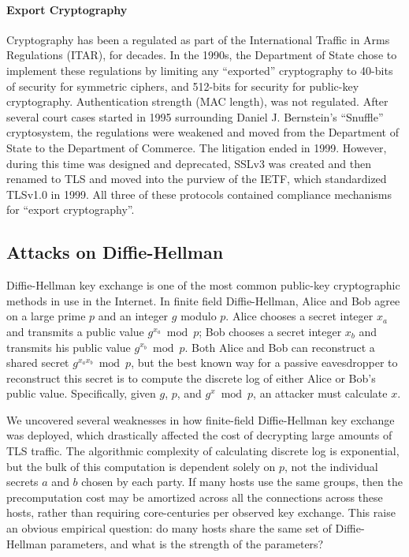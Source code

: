 \paragraph{Export Cryptography}
Cryptography has been a regulated as part of the International Traffic in Arms
Regulations (ITAR), for decades. In the 1990s, the Department of State chose to
implement these regulations by limiting any ``exported'' cryptography to
40-bits of security for symmetric ciphers, and 512-bits for security for
public-key cryptography. Authentication strength (\eg MAC length), was not
regulated. After several court cases started in 1995 surrounding Daniel J.
Bernstein's ``Snuffle'' cryptosystem, the regulations were weakened and moved
from the Department of State to the Department of Commerce. The litigation
ended in 1999. However, during this time \ssltwo was designed and deprecated,
SSLv3 was created and then renamed to TLS and moved into the purview of the
IETF, which standardized TLSv1.0 in 1999. All three of these protocols
contained compliance mechanisms for ``export cryptography''.

\subsection{Attacks on Diffie-Hellman}

Diffie-Hellman key exchange is one of the most common public-key
cryptographic methods in use in the Internet. In finite field Diffie-Hellman,
Alice and Bob agree on a large prime $p$ and an integer $g$ modulo $p$. Alice
chooses a secret integer $x_a$ and transmits a public value $g^{x_a} \bmod
p$; Bob chooses a secret integer $x_b$ and transmits his public value
$g^{x_b} \bmod p$. Both Alice and Bob can reconstruct a shared secret $g^{x_a
x_b} \bmod p$, but the best known way for a passive eavesdropper to
reconstruct this secret is to compute the discrete log of either Alice or
Bob's public value. Specifically, given $g$, $p$, and $g^x \bmod p$, an
attacker must calculate $x$.

We uncovered several weaknesses in how finite-field Diffie-Hellman key
exchange was deployed, which drastically affected the cost of decrypting
large amounts of TLS traffic. The algorithmic complexity of calculating
discrete log is exponential, but the bulk of this computation is dependent
solely on $p$, not the individual secrets $a$ and $b$ chosen by each party.
If many hosts use the same groups, then the precomputation cost may be
amortized across all the connections across these hosts, rather than
requiring core-centuries per observed key exchange. This raise an obvious
empirical question: do many hosts share the same set of Diffie-Hellman
parameters, and what is the strength of the parameters?

